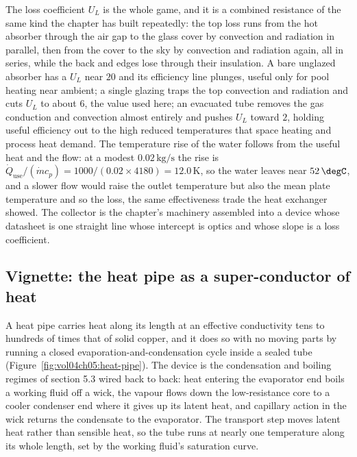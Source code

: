 The loss coefficient $U_L$ is the whole game, and it is a combined
resistance of the same kind the chapter has built repeatedly: the top loss
runs from the hot absorber through the air gap to the glass cover by
convection and radiation in parallel, then from the cover to the sky by
convection and radiation again, all in series, while the back and edges
lose through their insulation. A bare unglazed absorber has a $U_L$ near
$20$ and its efficiency line plunges, useful only for pool heating near
ambient; a single glazing traps the top convection and radiation and cuts
$U_L$ to about $6$, the value used here; an evacuated tube removes the gas
conduction and convection almost entirely and pushes $U_L$ toward $2$,
holding useful efficiency out to the high reduced temperatures that space
heating and process heat demand. The temperature rise of the water follows
from the useful heat and the flow: at a modest $0.02\,\text{kg/s}$ the rise
is $\dot{Q}_{\text{use}}/(\dot{m}c_p) = 1000/(0.02\times4180) =
12.0\,\si{\kelvin}$, so the water leaves near $52\,\degC$, and a slower
flow would raise the outlet temperature but also the mean plate
temperature and so the loss, the same effectiveness trade the heat
exchanger showed. The collector is the chapter's machinery assembled into
a device whose datasheet is one straight line whose intercept is optics
and whose slope is a loss coefficient.

\subsection{Vignette: the heat pipe as a super-conductor of heat}

A heat pipe carries heat along its length at an effective conductivity
tens to hundreds of times that of solid copper, and it does so with no
moving parts by running a closed evaporation-and-condensation cycle inside
a sealed tube (Figure~\ref{fig:vol04ch05:heat-pipe}). The device is the
condensation and boiling regimes of section 5.3 wired back to back: heat
entering the evaporator end boils a working fluid off a wick, the vapour
flows down the low-resistance core to a cooler condenser end where it gives
up its latent heat, and capillary action in the wick returns the condensate
to the evaporator. The transport step moves latent heat rather than
sensible heat, so the tube runs at nearly one temperature along its whole
length, set by the working fluid's saturation curve.



